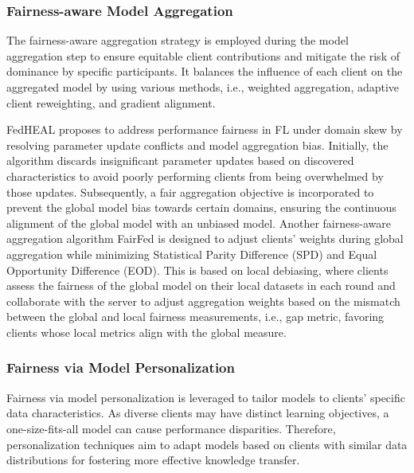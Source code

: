 \documentclass{article}
\begin{document}
\subsubsection{Fairness-aware Model Aggregation}
\label{Subsub_sec: Fairness in Model Aggregation}
The fairness-aware aggregation strategy is employed during the model aggregation step to ensure equitable client contributions and mitigate the risk of dominance by specific participants. It balances the influence of each client on the aggregated model by using various methods, i.e.,  weighted aggregation, adaptive client reweighting, and gradient alignment.

FedHEAL \cite{chen2024fairCvpr} proposes to address performance fairness in FL under domain skew by resolving parameter update conflicts and model aggregation bias. Initially, the algorithm discards insignificant parameter updates based on discovered characteristics to avoid poorly performing clients from being overwhelmed by those updates. Subsequently, a fair aggregation objective is incorporated to prevent the global model bias towards certain domains, ensuring the continuous alignment of the global model with an unbiased model. 
Another fairness-aware aggregation algorithm FairFed \cite{ezzeldin} is designed to adjust clients’ weights during global aggregation while minimizing Statistical Parity Difference (SPD) and Equal Opportunity Difference (EOD). This is based on local debiasing, where clients assess the fairness of the global model on their local datasets in each round and collaborate with the server to adjust aggregation weights based on the mismatch between the global and local fairness measurements, i.e., gap metric, favoring clients whose local metrics align with the global measure. 

\subsubsection{Fairness via Model Personalization}
\label{Subsub_sec: Fairness via Model Personalization}
Fairness via model personalization \cite{Collab_KDD_22,CVPR_Personlization} is leveraged to tailor models to clients' specific data characteristics. As diverse clients may have distinct learning objectives, a one-size-fits-all model can cause performance disparities. Therefore, personalization  techniques \cite{LiuZ0HGS24} aim to adapt models based on clients with similar data distributions for fostering more effective knowledge transfer.
\end{document}
